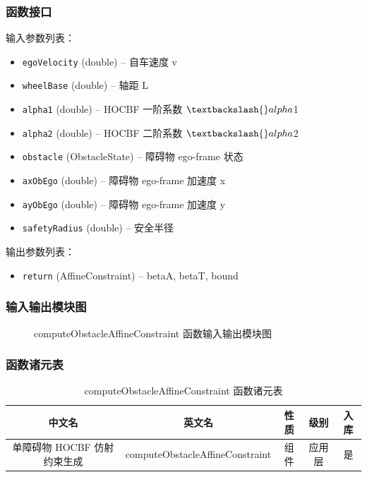 \documentclass[a4paper,10pt]{article}
\begin{document}
\subsubsection{函数接口}
\par 输入参数列表：
\begin{itemize}
  \item \texttt{egoVelocity} (double) -- 自车速度 v
  \item \texttt{wheelBase} (double) -- 轴距 L
  \item \texttt{alpha1} (double) -- HOCBF 一阶系数 $\textbackslash{}alpha$1
  \item \texttt{alpha2} (double) -- HOCBF 二阶系数 $\textbackslash{}alpha$2
  \item \texttt{obstacle} (ObstacleState) -- 障碍物 ego-frame 状态
  \item \texttt{axObEgo} (double) -- 障碍物 ego-frame 加速度 x
  \item \texttt{ayObEgo} (double) -- 障碍物 ego-frame 加速度 y
  \item \texttt{safetyRadius} (double) -- 安全半径
\end{itemize}
\par 输出参数列表：
\begin{itemize}
  \item \texttt{return} (AffineConstraint) -- {betaA, betaT, bound}
\end{itemize}
\subsubsection{输入输出模块图}
\begin{figure}[h]
    \centering
    \caption{computeObstacleAffineConstraint 函数输入输出模块图}
    \label{fig:io_computeObstacleAffineConstraint}
\end{figure}
\subsubsection{函数诸元表}
\begin{table}[h]
    \centering
    \caption{computeObstacleAffineConstraint 函数诸元表}
    \label{tab:meta_computeObstacleAffineConstraint}
    \begin{tabular}{|c|c|c|c|c|}
        \hline
        中文名 & 英文名 & 性质 & 级别 & 入库 \\ \hline
        单障碍物 HOCBF 仿射约束生成 & computeObstacleAffineConstraint & 组件 & 应用层 & 是 \\ \hline
    \end{tabular}
\end{table}
\end{document}
